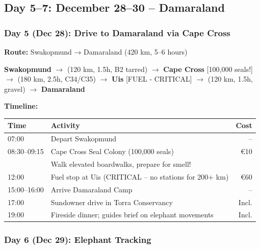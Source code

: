 \documentclass[11pt]{article}
\begin{document}
\clearpage
\subsection{Day 5--7: December 28--30 -- Damaraland}

\subsubsection{Day 5 (Dec 28): Drive to Damaraland via Cape Cross}

\textbf{Route:} Swakopmund → Damaraland (420 km, 5--6 hours)

\noindent\textbf{Swakopmund} $\rightarrow$ (120 km, 1.5h, B2 tarred) $\rightarrow$ \textbf{Cape Cross} [100,000 seals!] $\rightarrow$ (180 km, 2.5h, C34/C35) $\rightarrow$ \textbf{Uis} [FUEL - CRITICAL] $\rightarrow$ (120 km, 1.5h, gravel) $\rightarrow$ \textbf{Damaraland}

\textbf{Timeline:}

\begin{tabular}{llr}
\toprule
\textbf{Time} & \textbf{Activity} & \textbf{Cost} \\
\midrule
07:00 & Depart Swakopmund & -- \\
08:30--09:15 & Cape Cross Seal Colony (100,000 seals) & €10 \\
& Walk elevated boardwalks, prepare for smell! & \\
12:00 & Fuel stop at Uis (CRITICAL -- no stations for 200+ km) & €60 \\
15:00--16:00 & Arrive Damaraland Camp & -- \\
17:00 & Sundowner drive in Torra Conservancy & Incl. \\
19:00 & Fireside dinner; guides brief on elephant movements & Incl. \\
\bottomrule
\end{tabular}

\subsubsection{Day 6 (Dec 29): Elephant Tracking}
\end{document}

